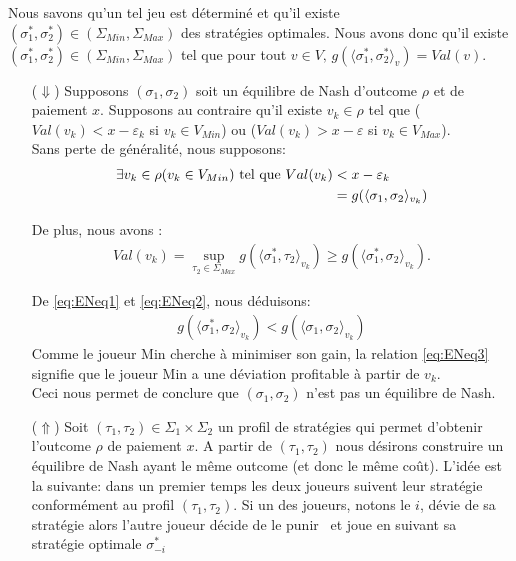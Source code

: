 \begin{demonstration}
	
	Nous savons qu'un tel jeu est déterminé et qu'il existe $(\sigma_{1}^* , \sigma_{2}^*) \in (\Sigma_{Min},\Sigma_{Max})$ des stratégies optimales. Nous avons donc qu'il existe $(\sigma_{1}^* , \sigma_{2}^*) \in (\Sigma_{Min},\Sigma_{Max})$ tel que pour tout $v \in V,\, g(\langle \sigma_1^*,\sigma_2^* \rangle_v) = Val(v)$. \\
	
	\begin{itemize}
		\item[($\Downarrow$)] Supposons $(\sigma_1, \sigma_2)$ soit un équilibre de Nash d'outcome $\rho$ et de paiement $x$. Supposons au contraire qu'il existe $v_k \in \rho$ tel que ($Val(v_k) < x - \varepsilon_k$ si $v_k \in V_{Min}$) ou ($Val(v_k) > x - \varepsilon $ si $v_k \in V_{Max}$).\\
		Sans perte de généralité, nous supposons:  
		\begin{align}
			\exists v_k \in \rho (v_k \in V_{Min}) \text{ tel que } Val(v_k) &< x - \varepsilon_k \notag \\
																			&= g(\langle \sigma_1, \sigma_2 \rangle_{v_k}) \label{eq:ENeq1}
		\end{align}
		
		De plus, nous avons :
		\begin{align} Val(v_k) = \sup_{\tau_2 \in \Sigma_{Max}} g(\langle \sigma_1^*, \tau_2 \rangle_{v_k}) \geq g(\langle \sigma_1^*,\sigma_2 \rangle_{v_k}). \label{eq:ENeq2}\end{align}
			
		De \eqref{eq:ENeq1} et \eqref{eq:ENeq2}, nous déduisons:
		\begin{align}
			g(\langle \sigma_1^*, \sigma_2 \rangle _{v_k}) < g (\langle \sigma_1, \sigma_2 \rangle_{v_k}) \label{eq:ENeq3}
		\end{align}
		Comme le joueur Min cherche à minimiser son gain, la relation \eqref{eq:ENeq3} signifie que le joueur Min a une déviation profitable  à partir de $v_k$.\\
		Ceci nous permet de conclure que $(\sigma_1,\sigma_2)$ n'est pas un équilibre de Nash.
		
		\item[($\Uparrow$)]
		Soit $(\tau_1, \tau_2) \in \Sigma_1 \times \Sigma_2$ un profil de stratégies qui permet d'obtenir l'outcome $\rho$ de paiement $x$.
		A partir de $(\tau_1, \tau_2)$ nous désirons construire un équilibre de Nash ayant le même outcome (et donc le même coût).
		L'idée est la suivante: dans un premier temps les deux joueurs suivent leur stratégie conformément au profil $(\tau_1,\tau_2)$. Si un des joueurs, notons le $i$,  dévie de sa stratégie alors l'autre joueur décide de le \og punir \fg~et joue en suivant sa stratégie optimale $\sigma_{-i}^*$\\ 
		

\end{itemize}
\end{demonstration}
